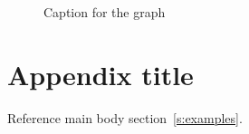 \documentclass{article}
\begin{document}
\begin{figure}[p]
    \caption{Caption for the graph}
    \label{fig:label1}
\end{figure}


\newpage
\printbibliography


\newpage
\appendix
\section{Appendix title}\label{a:appendix1}

Reference main body section~\ref{s:examples}. 

\end{document}
